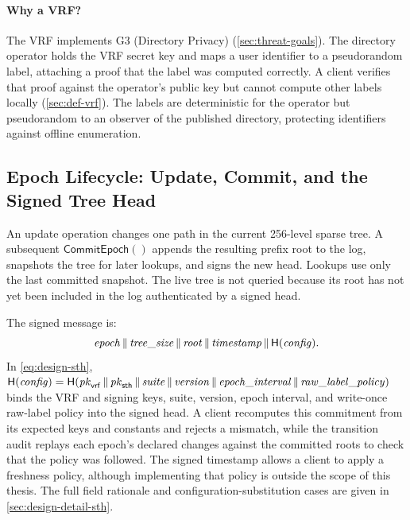 \paragraph{Why a VRF?} The VRF implements G3 (Directory Privacy)
(\cref{sec:threat-goals}). The directory operator holds the VRF secret key and maps a user
identifier to a pseudorandom label, attaching a proof that the label was computed
correctly. A client verifies that proof against the operator's public key but cannot compute other
labels locally (\cref{sec:def-vrf}). The labels are deterministic for the operator but
pseudorandom to an observer of the published directory, protecting identifiers against offline
enumeration.

\FloatBarrier
\subsection{Epoch Lifecycle: Update, Commit, and the Signed Tree Head}\label{ssec:design-epoch}

An update operation changes one path in the current 256-level sparse
tree. A subsequent $\textsf{CommitEpoch}()$ appends the resulting prefix root to the log,
snapshots the tree for later lookups, and signs the new head. Lookups use only the last committed
snapshot. The live tree is not queried because its root has not yet been included in the log
authenticated by a signed head.

The signed message is:
\begin{equation}\label{eq:design-sth}
  \mathit{epoch} \,\|\, \mathit{tree\_size} \,\|\, \mathit{root} \,\|\,
  \mathit{timestamp} \,\|\, \mathsf{H}(\mathit{config}).
\end{equation}
In \cref{eq:design-sth}, $\mathsf{H}(\mathit{config}) = \mathsf{H}(\mathit{pk}_{\mathsf{vrf}} \,\|\,
\mathit{pk}_{\mathsf{sth}} \,\|\, \mathit{suite} \,\|\, \mathit{version} \,\|\,
\mathit{epoch\_interval} \,\|\, \mathit{raw\_label\_policy})$ binds the VRF and signing keys,
suite, version, epoch interval, and write-once raw-label policy into the signed head. A client
recomputes this commitment from its expected keys and constants and rejects a mismatch, while the
transition audit replays each epoch's declared changes against the committed roots to check that the
policy was followed. The signed timestamp allows a client to apply a freshness policy, although
implementing that policy is outside the scope of this thesis. The full field rationale and
configuration-substitution cases are given in \cref{sec:design-detail-sth}.

